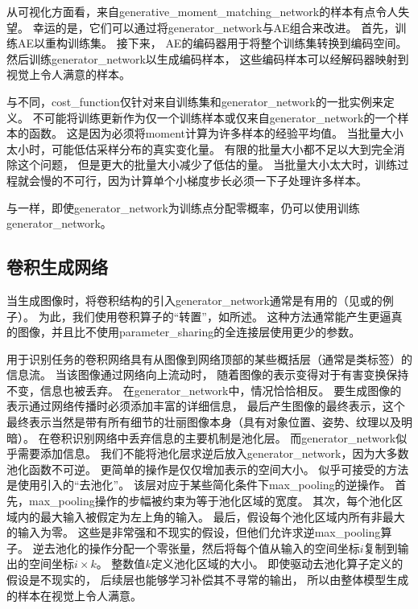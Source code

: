 从可视化方面看，来自\gls{generative_moment_matching_network}的样本有点令人失望。
幸运的是，它们可以通过将\gls{generator_network}与\gls{AE}组合来改进。
首先，训练\gls{AE}以重构训练集。
接下来， \gls{AE}的编码器用于将整个训练集转换到编码空间。
然后训练\gls{generator_network}以生成编码样本， 这些编码样本可以经解码器映射到视觉上令人满意的样本。

与不同，\gls{cost_function}仅针对来自训练集和\gls{generator_network}的一批实例来定义。
不可能将训练更新作为仅一个训练样本或仅来自\gls{generator_network}的一个样本的函数。
这是因为必须将\gls{moment}计算为许多样本的经验平均值。
当批量大小太小时，可能低估采样分布的真实变化量。
有限的批量大小都不足以大到完全消除这个问题， 但是更大的批量大小减少了低估的量。
当批量大小太大时，训练过程就会慢的不可行，因为计算单个小梯度步长必须一下子处理许多样本。

与一样，即使\gls{generator_network}为训练点分配零概率，仍可以使用训练\gls{generator_network}。


\subsection{卷积生成网络}
\label{sec:convolutional_generative_networks}
当生成图像时，将卷积结构的引入\gls{generator_network}通常是有用的（见\citet{Goodfellow-et-al-NIPS2014-small}或\citet{dosovitskiy2015learning}的例子）。
为此，我们使用卷积算子的``转置''，如所述。
这种方法通常能产生更逼真的图像，并且比不使用\gls{parameter_sharing}的全连接层使用更少的参数。


用于识别任务的卷积网络具有从图像到网络顶部的某些概括层（通常是类标签）的信息流。
当该图像通过网络向上流动时， 随着图像的表示变得对于有害变换保持不变，信息也被丢弃。
在\gls{generator_network}中，情况恰恰相反。
要生成图像的表示通过网络传播时必须添加丰富的详细信息， 最后产生图像的最终表示，这个最终表示当然是带有所有细节的壮丽图像本身（具有对象位置、姿势、纹理以及明暗）。
在卷积识别网络中丢弃信息的主要机制是池化层。
而\gls{generator_network}似乎需要添加信息。
我们不能将池化层求逆后放入\gls{generator_network}，因为大多数池化函数不可逆。
更简单的操作是仅仅增加表示的空间大小。
似乎可接受的方法是使用\citet{dosovitskiy2015learning}引入的``去池化''。
该层对应于某些简化条件下\gls{max_pooling}的逆操作。
首先，\gls{max_pooling}操作的步幅被约束为等于池化区域的宽度。
其次，每个池化区域内的最大输入被假定为左上角的输入。
最后，假设每个池化区域内所有非最大的输入为零。
这些是非常强和不现实的假设，但他们允许求逆\gls{max_pooling}算子。
逆去池化的操作分配一个零张量，然后将每个值从输入的空间坐标$i$复制到输出的空间坐标$i \times k$。
整数值$k$定义池化区域的大小。
即使驱动去池化算子定义的假设是不现实的， 后续层也能够学习补偿其不寻常的输出， 所以由整体模型生成的样本在视觉上令人满意。

